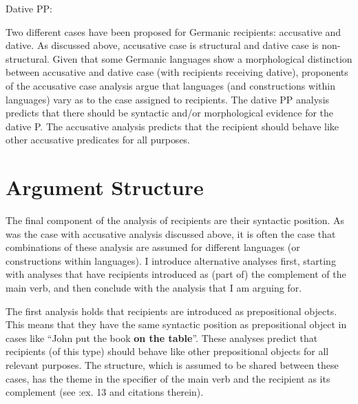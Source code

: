 \begin{exe}
\ex Dative PP: \\
\end{exe}

Two different cases have been proposed for Germanic recipients: accusative and dative. As discussed above, accusative case is structural and dative case is non-structural. Given that some Germanic languages show a morphological distinction between accusative and dative case (with recipients receiving dative), proponents of the accusative case analysis argue that languages (and constructions within languages) vary as to the case assigned to recipients. The dative PP analysis predicts that there should be syntactic and/or morphological evidence for the dative P. The accusative analysis predicts that the recipient should behave like other accusative predicates for all purposes.

\section{Argument Structure}
The final component of the analysis of recipients are their syntactic position. As was the case with accusative analysis discussed above, it is often the case that combinations of these analysis are assumed for different languages (or constructions within languages). I introduce alternative analyses first, starting with analyses that have recipients introduced as (part of) the complement of the main verb, and then conclude with the analysis that I am arguing for.

The first analysis holds that recipients are introduced as prepositional objects. This means that they have the same syntactic position as prepositional object in cases like ``John put the book \textbf{on the table}''. These analyses predict that recipients (of this type) should behave like other prepositional objects for all relevant purposes. The structure, which is assumed to be shared between these cases, has the theme in the specifier of the main verb and the recipient as its complement (see \citealt{Larson.1988}:ex. 13 and citations therein).

